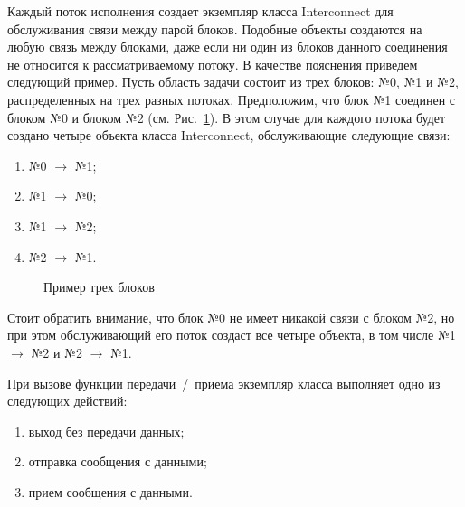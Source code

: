 \documentclass[a4paper, 14pt]{extarticle}
\theoremstyle{definition}
\begin{document}
\par Каждый поток исполнения создает экземпляр класса Interconnect для обслуживания связи между парой блоков. Подобные объекты создаются на любую связь между блоками, даже если ни один из блоков данного соединения не относится к рассматриваемому потоку. В качестве пояснения приведем следующий пример. Пусть область задачи состоит из трех блоков: №0, №1 и №2, распределенных на трех разных потоках. Предположим, что блок №1 соединен с блоком №0 и блоком №2 (см. Рис.~\ref{ris:3Block_ex}). В этом случае для каждого потока будет создано четыре объекта класса Interconnect, обслуживающие следующие связи:
\begin{enumerate}
\item[1)] {№0 $\to$ №1};
\item[2)] {№1 $\to$ №0};
\item[3)] {№1 $\to$ №2};
\item[4)] {№2 $\to$ №1}.
\end{enumerate}

\begin{figure}[h]
	\caption{Пример трех блоков}
	\label{ris:3Block_ex}
\end{figure}

\par Стоит обратить внимание, что блок №0 не имеет никакой связи с блоком №2, но при этом обслуживающий его поток создаст все четыре объекта, в том числе {№1 $\to$ №2} и {№2 $\to$ №1}. 

\par При вызове функции передачи~/~приема экземпляр класса выполняет одно из следующих действий:
\begin{enumerate}
\item[1)] выход без передачи данных;
\item[2)] отправка сообщения с данными;
\item[3)] прием сообщения с данными.
\end{enumerate}
\end{document}
